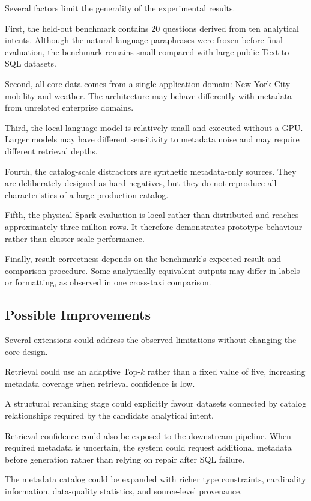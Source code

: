 Several factors limit the generality of the experimental results.

First, the held-out benchmark contains 20 questions derived from ten analytical
intents. Although the natural-language paraphrases were frozen before final
evaluation, the benchmark remains small compared with large public
Text-to-SQL datasets.

Second, all core data comes from a single application domain: New York City
mobility and weather. The architecture may behave differently with metadata
from unrelated enterprise domains.

Third, the local language model is relatively small and executed without a
GPU. Larger models may have different sensitivity to metadata noise and may
require different retrieval depths.

Fourth, the catalog-scale distractors are synthetic metadata-only sources.
They are deliberately designed as hard negatives, but they do not reproduce
all characteristics of a large production catalog.

Fifth, the physical Spark evaluation is local rather than distributed and
reaches approximately three million rows. It therefore demonstrates prototype
behaviour rather than cluster-scale performance.

Finally, result correctness depends on the benchmark's expected-result and
comparison procedure. Some analytically equivalent outputs may differ in
labels or formatting, as observed in one cross-taxi comparison.


\subsection{Possible Improvements}

Several extensions could address the observed limitations without changing the
core design.

Retrieval could use an adaptive Top-\(k\) rather than a fixed value of five,
increasing metadata coverage when retrieval confidence is low.

A structural reranking stage could explicitly favour datasets connected by
catalog relationships required by the candidate analytical intent.

Retrieval confidence could also be exposed to the downstream pipeline. When
required metadata is uncertain, the system could request additional metadata
before generation rather than relying on repair after SQL failure.

The metadata catalog could be expanded with richer type constraints,
cardinality information, data-quality statistics, and source-level
provenance.


